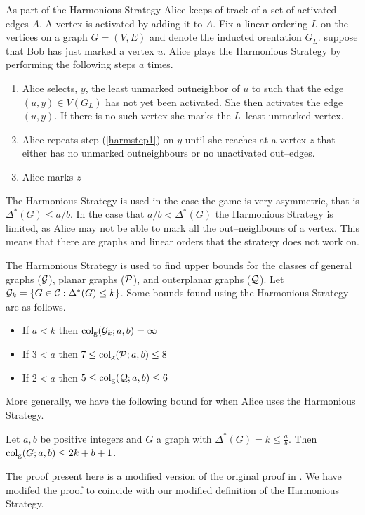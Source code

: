 As part of the Harmonious Strategy Alice keeps of track of a set of activated edges $A$. A vertex is activated by adding it to $A$.
Fix a linear ordering $L$ on the vertices on a graph $G=(V,E)$ and denote the inducted orentation $G_L$. suppose that Bob has just marked a vertex $u$. Alice plays the Harmonious Strategy by performing the following steps $a$ times.    
\begin{enumerate}
    \item  Alice selects, $y$, the least unmarked outneighbor of $u$ to such that the edge $(u,y)\in V(G_L)$ has not yet been activated. She then activates the edge $(u,y)$. If there is no such vertex she marks the $L$--least unmarked vertex. \label{harmstep1}
    \item  Alice repeats step (\ref{harmstep1}) on $y$ until she reaches at a vertex $z$ that either has no unmarked outneighbours or no unactivated out--edges. 
    \item  Alice marks $z$
\end{enumerate}

The Harmonious Strategy is used in the case the game is very asymmetric, that is $\Delta^*(G)\leq a/b$. In the case that $a/b < \Delta^*(G)$ the Harmonious Strategy is limited, as Alice may not be able to mark all the out--neighbours of a vertex. This means that there are graphs and linear orders that the strategy does not work on.

The Harmonious Strategy is used to find upper bounds for the classes of general graphs ($ \mathcal{G} $), planar graphs ($\mathcal{P}$), and outerplanar graphs ($ \mathcal{Q} $). Let $\mathcal{G}_k= \{G\in\mathcal{C}: \Delta^*(G)\leq k\}$. Some bounds found using the Harmonious Strategy are as follows.    
\begin{itemize}
    \item If $a < k$ then $\operatorname{col_g}(\mathcal{G}_k;a,b)=\infty$
    \item If $3<a $ then $7\leq \operatorname{col_g}(\mathcal{P};a,b)\leq 8$
    \item If $2< a$ then $5\leq \operatorname{col_g}(\mathcal{Q};a,b)\leq 6$
\end{itemize}
More generally, we have the following bound for when Alice uses the Harmonious Strategy.
\begin{theorem}
    Let $a,b$ be positive integers and $G$ a graph with $\Delta^*(G)=k\leq\frac{a}{b}$. Then $\operatorname{col_g}(G;a,b)\leq 2k+b+1$.
\end{theorem}

The proof present here is a modified version of the original proof in \cite{kierYang2005}. We have modifed the proof to coincide with our modified definition of the  Harmonious Strategy.

